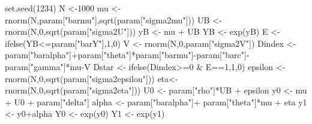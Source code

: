 \documentclass[
]{book}
\newenvironment{Shaded}{\begin{snugshade}}{\end{snugshade}}
\newcommand{\DecValTok}[1]{\textcolor[rgb]{0.00,0.00,0.81}{#1}}
\newcommand{\FunctionTok}[1]{\textcolor[rgb]{0.00,0.00,0.00}{#1}}
\newcommand{\NormalTok}[1]{#1}
\newcommand{\OtherTok}[1]{\textcolor[rgb]{0.56,0.35,0.01}{#1}}
\newcommand{\SpecialCharTok}[1]{\textcolor[rgb]{0.00,0.00,0.00}{#1}}
\newcommand{\StringTok}[1]{\textcolor[rgb]{0.31,0.60,0.02}{#1}}
\theoremstyle{definition}
\theoremstyle{definition}
\theoremstyle{definition}
\theoremstyle{definition}
\theoremstyle{remark}
\begin{document}
\begin{Shaded}
\begin{Highlighting}[]
\FunctionTok{set.seed}\NormalTok{(}\DecValTok{1234}\NormalTok{)}
\NormalTok{N }\OtherTok{\textless{}{-}}\DecValTok{1000}
\NormalTok{mu }\OtherTok{\textless{}{-}} \FunctionTok{rnorm}\NormalTok{(N,param[}\StringTok{"barmu"}\NormalTok{],}\FunctionTok{sqrt}\NormalTok{(param[}\StringTok{"sigma2mu"}\NormalTok{]))}
\NormalTok{UB }\OtherTok{\textless{}{-}} \FunctionTok{rnorm}\NormalTok{(N,}\DecValTok{0}\NormalTok{,}\FunctionTok{sqrt}\NormalTok{(param[}\StringTok{"sigma2U"}\NormalTok{]))}
\NormalTok{yB }\OtherTok{\textless{}{-}}\NormalTok{ mu }\SpecialCharTok{+}\NormalTok{ UB }
\NormalTok{YB }\OtherTok{\textless{}{-}} \FunctionTok{exp}\NormalTok{(yB)}
\NormalTok{E }\OtherTok{\textless{}{-}} \FunctionTok{ifelse}\NormalTok{(YB}\SpecialCharTok{\textless{}=}\NormalTok{param[}\StringTok{"barY"}\NormalTok{],}\DecValTok{1}\NormalTok{,}\DecValTok{0}\NormalTok{)}
\NormalTok{V }\OtherTok{\textless{}{-}} \FunctionTok{rnorm}\NormalTok{(N,}\DecValTok{0}\NormalTok{,param[}\StringTok{"sigma2V"}\NormalTok{])}
\NormalTok{Dindex }\OtherTok{\textless{}{-}}\NormalTok{ param[}\StringTok{"baralpha"}\NormalTok{]}\SpecialCharTok{+}\NormalTok{param[}\StringTok{"theta"}\NormalTok{]}\SpecialCharTok{*}\NormalTok{param[}\StringTok{"barmu"}\NormalTok{]}\SpecialCharTok{{-}}\NormalTok{param[}\StringTok{"barc"}\NormalTok{]}\SpecialCharTok{{-}}\NormalTok{param[}\StringTok{"gamma"}\NormalTok{]}\SpecialCharTok{*}\NormalTok{mu}\SpecialCharTok{{-}}\NormalTok{V}
\NormalTok{Dstar }\OtherTok{\textless{}{-}} \FunctionTok{ifelse}\NormalTok{(Dindex}\SpecialCharTok{\textgreater{}=}\DecValTok{0} \SpecialCharTok{\&}\NormalTok{ E}\SpecialCharTok{==}\DecValTok{1}\NormalTok{,}\DecValTok{1}\NormalTok{,}\DecValTok{0}\NormalTok{)}
\NormalTok{epsilon }\OtherTok{\textless{}{-}} \FunctionTok{rnorm}\NormalTok{(N,}\DecValTok{0}\NormalTok{,}\FunctionTok{sqrt}\NormalTok{(param[}\StringTok{"sigma2epsilon"}\NormalTok{]))}
\NormalTok{eta}\OtherTok{\textless{}{-}} \FunctionTok{rnorm}\NormalTok{(N,}\DecValTok{0}\NormalTok{,}\FunctionTok{sqrt}\NormalTok{(param[}\StringTok{"sigma2eta"}\NormalTok{]))}
\NormalTok{U0 }\OtherTok{\textless{}{-}}\NormalTok{ param[}\StringTok{"rho"}\NormalTok{]}\SpecialCharTok{*}\NormalTok{UB }\SpecialCharTok{+}\NormalTok{ epsilon}
\NormalTok{y0 }\OtherTok{\textless{}{-}}\NormalTok{ mu }\SpecialCharTok{+}\NormalTok{  U0 }\SpecialCharTok{+}\NormalTok{ param[}\StringTok{"delta"}\NormalTok{]}
\NormalTok{alpha }\OtherTok{\textless{}{-}}\NormalTok{ param[}\StringTok{"baralpha"}\NormalTok{]}\SpecialCharTok{+}\NormalTok{  param[}\StringTok{"theta"}\NormalTok{]}\SpecialCharTok{*}\NormalTok{mu }\SpecialCharTok{+}\NormalTok{ eta}
\NormalTok{y1 }\OtherTok{\textless{}{-}}\NormalTok{ y0}\SpecialCharTok{+}\NormalTok{alpha}
\NormalTok{Y0 }\OtherTok{\textless{}{-}} \FunctionTok{exp}\NormalTok{(y0)}
\NormalTok{Y1 }\OtherTok{\textless{}{-}} \FunctionTok{exp}\NormalTok{(y1)}
\end{Highlighting}
\end{Shaded}
\end{document}
